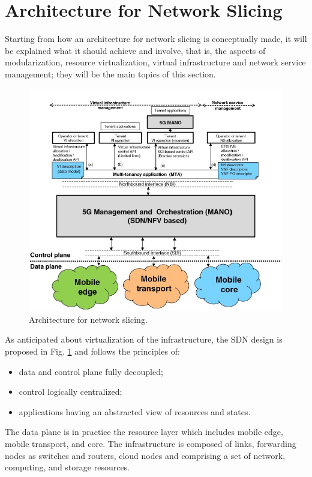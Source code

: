 \documentclass[a4paper,12pt]{report} %
\begin{document}
\section{Architecture for Network Slicing} 
Starting from how an architecture for network slicing is conceptually made, it will be explained what it should achieve and involve, that is, the aspects of modularization, resource virtualization, virtual infrastructure and network service management; they will be the main topics of this section.
\begin{figure}[h]
\centering
\includegraphics[scale=0.67]{pics/2.JPG}
\caption{Architecture for network slicing. \cite{al20185g}} 
\label{Arch}
\end{figure}
As anticipated about virtualization of the infrastructure, the SDN design is proposed in Fig. \ref{Arch} and follows the principles of:
\begin{itemize}
\item data and control plane fully decoupled;
\end{itemize}
\begin{itemize}
\item control logically centralized;
\end{itemize}
\begin{itemize}
\item applications having an abstracted view of resources and states.
\end{itemize}
The data plane is in practice the resource layer which includes mobile edge, mobile transport, and core. The infrastructure is composed of links, forwarding nodes as switches and routers, cloud nodes  and comprising a set of network, computing, and storage resources.\\
\end{document}
